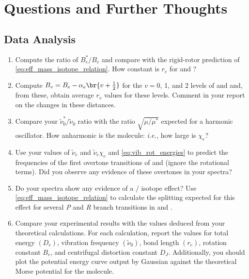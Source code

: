 \documentclass[nobib,nofonts,nols,nohyper]{tufte-handout}
\begin{document}
\section{Questions and Further Thoughts} %
\label{sec:questions_and_further_thoughts}

\subsection{Data Analysis} %
\label{sub:data_analysis}

\begin{enumerate}
	\item Compute the ratio of \( B_e^*/B_e \) and compare with the rigid-rotor prediction of \cref{eq:eff_mass_isotope_relation}. 
	How constant is \( r_e \) for  and ?
	\item Compute \( B_v = B_e - \alpha_e\br{v + \tfrac{1}{2}} \) for the \( v = 0 \), \num{1}, and \num{2} levels of  and  and, from these, obtain average \( r_v \) values for these levels. 
	Comment in your report on the changes in these distances. 
	\item Compare your \( \widetilde{\nu}_0^*/\widetilde{\nu}_0 \) ratio with the ratio \( \sqrt{\mu/\mu^*} \) expected for a harmonic oscillator. How anharmonic is the  molecule: \emph{i.e.,} how large is \( \chi_e \)?
	\item Use your values of \( \widetilde{\nu}_e \) and \( \widetilde{\nu}_e \chi_e \) and \cref{eq:vib_rot_energies} to predict the frequencies of the first overtone transitions of  and  (ignore the rotational terms). 
	Did you observe any evidence of these overtones in your spectra? 
	\item Do your spectra show any evidence of a / isotope effect? 
	Use \cref{eq:eff_mass_isotope_relation} to calculate the splitting expected for this effect for several \emph{P} and \emph{R} branch transitions in  and . 
	\item Compare your experimental results with the values deduced from your theoretical calculations. 
	For each calculation, report the values for total energy \( (D_e) \), vibration frequency \( (\widetilde{\nu}_0) \), bond length \( (r_e) \), rotation constant \( B_e \), and centrifugal distortion constant \( D_J \). 
	Additionally, you should plot the potential energy curve output by Gaussian against the theoretical Morse potential for the molecule. 
\end{enumerate}
\end{document}
